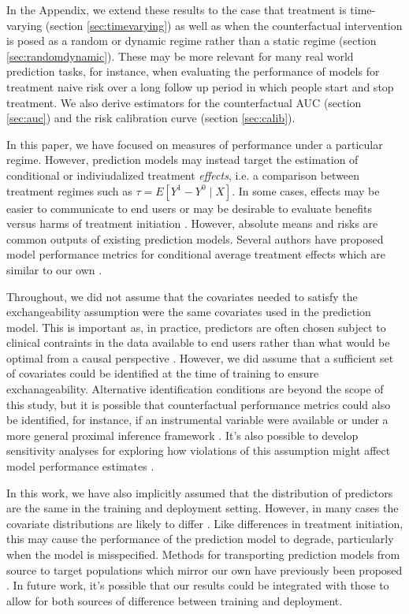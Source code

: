 In the Appendix, we extend these results to the case that treatment is time-varying (section \ref{sec:timevarying}) as well as when the counterfactual intervention is posed as a random or dynamic regime rather than a static regime (section \ref{sec:randomdynamic}). These may be more relevant for many real world prediction tasks, for instance, when evaluating the performance of models for treatment naive risk over a long follow up period in which people start and stop treatment. We also derive estimators for the counterfactual AUC (section \ref{sec:auc}) and the risk calibration curve (section \ref{sec:calib}). 

In this paper, we have focused on measures of performance under a particular regime. However, prediction models may instead target the estimation of conditional or indiviudalized treatment \textit{effects}, i.e. a comparison between treatment regimes such as $\tau = E[Y^1 - Y^0 \mid X]$. In some cases, effects may be easier to communicate to end users or may be desirable to evaluate benefits versus harms of treatment initiation \cite{kent_predictive_2020}. However, absolute means and risks are common outputs of existing prediction models. Several authors have proposed model performance metrics for conditional average treatment effects which are similar to our own \cite{schuler_comparison_2018,rolling2014model,xu_calibration_2022,van2003unified,alaa_validating_2019}.

Throughout, we did not assume that the covariates needed to satisfy the exchangeability assumption were the same covariates used in the prediction model. This is important as, in practice,  predictors are often chosen subject to clinical contraints in the data available to end users rather than what would be optimal from a causal perspective \cite{steyerberg_clinical_2019}. However, we did assume that a sufficient set of covariates could be identified at the time of training to ensure exchanageability. Alternative identification conditions are beyond the scope of this study, but it is possible that counterfactual performance metrics could also be identified, for instance, if an instrumental variable \cite{hernan_instruments_2006} were available or under a more general proximal inference framework \cite{tchetgen_introduction_2020}. It's also possible to develop sensitivity analyses for exploring how violations of this assumption might affect model performance estimates \cite{robins_sensitivity_2000}.

In this work, we have also implicitly assumed that the distribution of predictors are the same in the training and deployment setting. However, in many cases the covariate distributions are likely to differ \cite{bickel_discriminative_2009,sugiyama_covariate_2007}. Like differences in treatment initiation, this may cause the performance of the prediction model to degrade, particularly when the model is misspecified. Methods for transporting prediction models from source to target populations which mirror our own have previously been proposed \cite{steingrimsson_extending_2022,steingrimsson_transporting_2023,li_estimating_2022,morrison_robust_2022}. In future work, it's possible that our results could be integrated with those to allow for both sources of difference between training and deployment.

